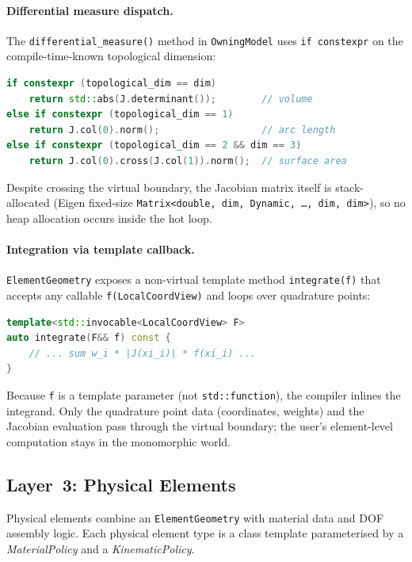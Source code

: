 \paragraph{Differential measure dispatch.}
The \texttt{differential\_measure()} method in \texttt{OwningModel} uses
\texttt{if constexpr} on the compile-time-known topological dimension:
\begin{lstlisting}[language=C++]
if constexpr (topological_dim == dim)
    return std::abs(J.determinant());        // volume
else if constexpr (topological_dim == 1)
    return J.col(0).norm();                  // arc length
else if constexpr (topological_dim == 2 && dim == 3)
    return J.col(0).cross(J.col(1)).norm();  // surface area
\end{lstlisting}
Despite crossing the virtual boundary, the Jacobian matrix itself is
stack-allocated (Eigen fixed-size \texttt{Matrix<double, dim, Dynamic, \ldots,
dim, dim>}), so no heap allocation occurs inside the hot loop.

\paragraph{Integration via template callback.}
\texttt{ElementGeometry} exposes a non-virtual template method
\texttt{integrate(f)} that accepts any callable \texttt{f(LocalCoordView)}
and loops over quadrature points:
\begin{lstlisting}[language=C++]
template<std::invocable<LocalCoordView> F>
auto integrate(F&& f) const {
    // ... sum w_i * |J(xi_i)| * f(xi_i) ...
}
\end{lstlisting}
Because \texttt{f} is a template parameter (not \texttt{std::function}), the
compiler inlines the integrand.  Only the quadrature point data (coordinates,
weights) and the Jacobian evaluation pass through the virtual boundary; the
user's element-level computation stays in the monomorphic world.


\subsection{Layer~3: Physical Elements}
\label{sec:physical_elements}

Physical elements combine an \texttt{ElementGeometry} with material data and
DOF assembly logic.  Each physical element type is a class template
parameterised by a \emph{MaterialPolicy} and a \emph{KinematicPolicy}.

